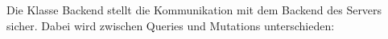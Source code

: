 Die Klasse Backend stellt die Kommunikation mit dem Backend des Servers sicher.
Dabei wird zwischen Queries und Mutations unterschieden: